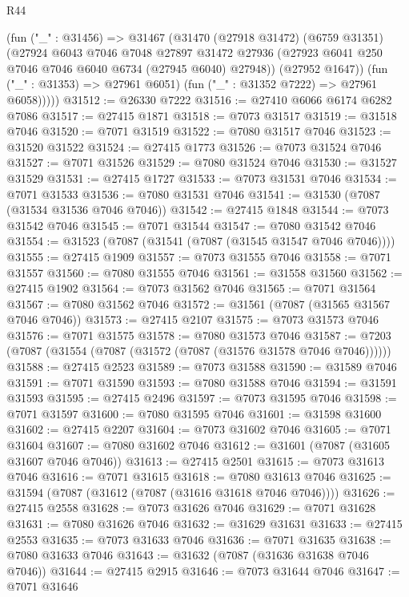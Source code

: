 \begin{lexlean}{R44}
\begin{coremodule}
{          (fun ("_" : @31456) =>
          @31467
            (@31470
              (@27918 @31472)
              (@6759 @31351)
              (@27924
                @6043
                @7046
                @7048
                @27897
                @31472
                @27936
                (@27923 @6041 @250 @7046 @7046 @6040 @6734 (@27945 @6040) @27948))
              (@27952 @1647))
            (fun ("_" : @31353) => @27961 @6051)
            (fun ("_" : @31352 @7222) => @27961 @6058)))))
@31512 := @26330 @7222
@31516 := @27410 @6066 @6174 @6282 @7086
@31517 := @27415 @1871
@31518 := @7073 @31517
@31519 := @31518 @7046
@31520 := @7071 @31519
@31522 := @7080 @31517 @7046
@31523 := @31520 @31522
@31524 := @27415 @1773
@31526 := @7073 @31524 @7046
@31527 := @7071 @31526
@31529 := @7080 @31524 @7046
@31530 := @31527 @31529
@31531 := @27415 @1727
@31533 := @7073 @31531 @7046
@31534 := @7071 @31533
@31536 := @7080 @31531 @7046
@31541 := @31530 (@7087 (@31534 @31536 @7046 @7046))
@31542 := @27415 @1848
@31544 := @7073 @31542 @7046
@31545 := @7071 @31544
@31547 := @7080 @31542 @7046
@31554 := @31523 (@7087 (@31541 (@7087 (@31545 @31547 @7046 @7046))))
@31555 := @27415 @1909
@31557 := @7073 @31555 @7046
@31558 := @7071 @31557
@31560 := @7080 @31555 @7046
@31561 := @31558 @31560
@31562 := @27415 @1902
@31564 := @7073 @31562 @7046
@31565 := @7071 @31564
@31567 := @7080 @31562 @7046
@31572 := @31561 (@7087 (@31565 @31567 @7046 @7046))
@31573 := @27415 @2107
@31575 := @7073 @31573 @7046
@31576 := @7071 @31575
@31578 := @7080 @31573 @7046
@31587 := @7203 (@7087 (@31554 (@7087 (@31572 (@7087 (@31576 @31578 @7046 @7046))))))
@31588 := @27415 @2523
@31589 := @7073 @31588
@31590 := @31589 @7046
@31591 := @7071 @31590
@31593 := @7080 @31588 @7046
@31594 := @31591 @31593
@31595 := @27415 @2496
@31597 := @7073 @31595 @7046
@31598 := @7071 @31597
@31600 := @7080 @31595 @7046
@31601 := @31598 @31600
@31602 := @27415 @2207
@31604 := @7073 @31602 @7046
@31605 := @7071 @31604
@31607 := @7080 @31602 @7046
@31612 := @31601 (@7087 (@31605 @31607 @7046 @7046))
@31613 := @27415 @2501
@31615 := @7073 @31613 @7046
@31616 := @7071 @31615
@31618 := @7080 @31613 @7046
@31625 := @31594 (@7087 (@31612 (@7087 (@31616 @31618 @7046 @7046))))
@31626 := @27415 @2558
@31628 := @7073 @31626 @7046
@31629 := @7071 @31628
@31631 := @7080 @31626 @7046
@31632 := @31629 @31631
@31633 := @27415 @2553
@31635 := @7073 @31633 @7046
@31636 := @7071 @31635
@31638 := @7080 @31633 @7046
@31643 := @31632 (@7087 (@31636 @31638 @7046 @7046))
@31644 := @27415 @2915
@31646 := @7073 @31644 @7046
@31647 := @7071 @31646
}
\end{coremodule}
\end{lexlean}
